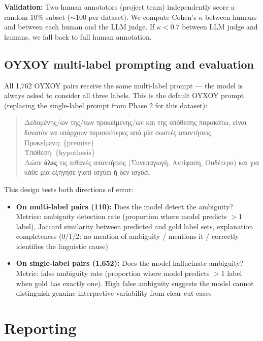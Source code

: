 \documentclass[11pt,a4paper]{article}
\begin{document}
\textbf{Validation:} Two human annotators (project team) independently score a random 10\% subset ($\sim$100 per dataset). We compute Cohen's $\kappa$ between humans and between each human and the LLM judge. If $\kappa < 0.7$ between LLM judge and humans, we fall back to full human annotation.

\subsection{OYXOY multi-label prompting and evaluation}
\label{sec:multilabel}

All 1,762 OYXOY pairs receive the same multi-label prompt --- the model is always asked to consider all three labels. This is the default OYXOY prompt (replacing the single-label prompt from Phase 2 for this dataset):

\begin{quote}\small\ttfamily
Δεδομένης/ων της/των προκείμενης/ων και της υπόθεσης παρακάτω, είναι δυνατόν να υπάρχουν περισσότερες από μία σωστές απαντήσεις.\\[2pt]
Προκείμενη: \{premise\}\\
Υπόθεση: \{hypothesis\}\\[2pt]
Δώσε \textbf{όλες} τις πιθανές απαντήσεις (Συνεπαγωγή, Αντίφαση, Ουδέτερο) και για κάθε μία εξήγησε γιατί ισχύει ή δεν ισχύει.
\end{quote}

This design tests both directions of error:

\begin{itemize}[nosep,leftmargin=1.5em]
\item \textbf{On multi-label pairs (110):} Does the model detect the ambiguity? Metrics: ambiguity detection rate (proportion where model predicts $>$1 label), Jaccard similarity between predicted and gold label sets, explanation completeness (0/1/2: no mention of ambiguity / mentions it / correctly identifies the linguistic cause)
\item \textbf{On single-label pairs (1,652):} Does the model hallucinate ambiguity? Metric: false ambiguity rate (proportion where model predicts $>$1 label when gold has exactly one). High false ambiguity suggests the model cannot distinguish genuine interpretive variability from clear-cut cases
\end{itemize}

\section{Reporting}
\end{document}
